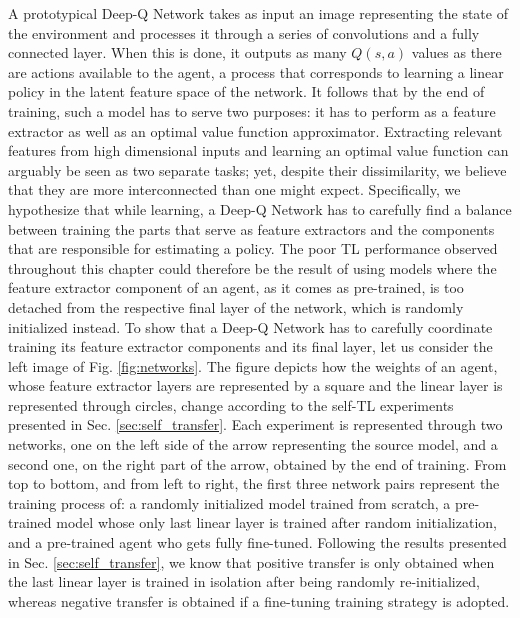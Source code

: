 A prototypical Deep-Q Network takes as input an image representing the state of the environment and processes it through a series of convolutions and a fully connected layer. When this is done, it outputs as many $Q(s,a)$ values as there are actions available to the agent, a process that corresponds to learning a linear policy in the latent feature space of the network. It follows that by the end of training, such a model has to serve two purposes: it has to perform as a feature extractor as well as an optimal value function approximator.
Extracting relevant features from high dimensional inputs and learning an optimal value function can arguably be seen as two separate tasks; yet, despite their dissimilarity, we believe that they are more interconnected than one might expect. Specifically, we hypothesize that while learning, a Deep-Q Network has to carefully find a balance between training the parts that serve as feature extractors and the components that are responsible for estimating a policy. The poor TL performance observed throughout this chapter could therefore be the result of using models where the feature extractor component of an agent, as it comes as pre-trained, is too detached from the respective final layer of the network, which is randomly initialized instead.   
To show that a Deep-Q Network has to carefully coordinate training its feature extractor components and its final layer, let us consider the left image of Fig. \ref{fig:networks}. The figure depicts how the weights of an agent, whose feature extractor layers are represented by a square and the linear layer is represented through circles, change according to the self-TL experiments presented in Sec. \ref{sec:self_transfer}. Each experiment is represented through two networks, one on the left side of the arrow representing the source model, and a second one, on the right part of the arrow, obtained by the end of training. From top to bottom, and from left to right, the first three network pairs represent the training process of: a randomly initialized model trained from scratch, a pre-trained model whose only last linear layer is trained after random initialization, and a pre-trained agent who gets fully fine-tuned. Following the results presented in Sec. \ref{sec:self_transfer}, we know that positive transfer is only obtained when the last linear layer is trained in isolation after being randomly re-initialized, whereas negative transfer is obtained if a fine-tuning training strategy is adopted.  

